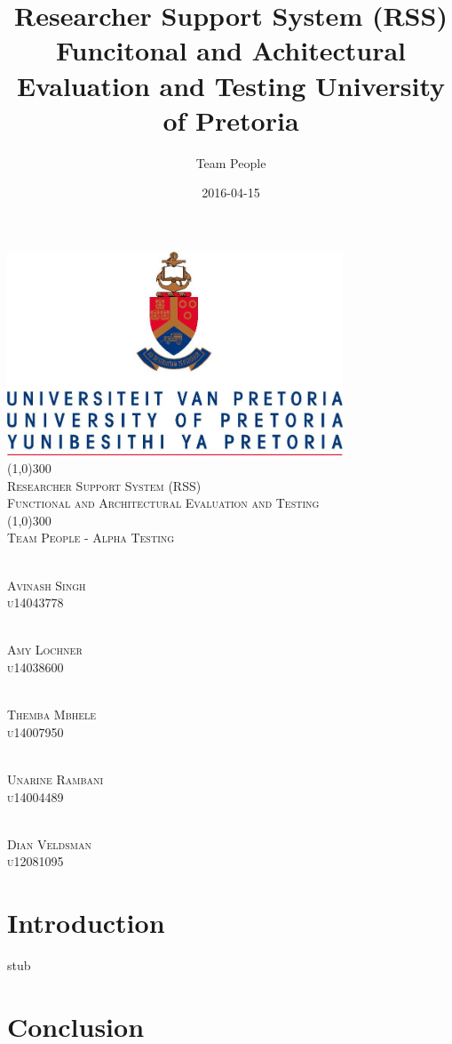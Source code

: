 \documentclass{article}
\title{
Researcher Support System (RSS)
Funcitonal and Achitectural Evaluation and Testing
University of Pretoria
}
\date{2016-04-15}
\author{Team People}
\begin{document}
\begin{titlepage}
	\begin{center}
		\includegraphics[width=10cm]{UP.jpg}  \\
		[1cm]
		\line(1,0){300} \\
		[0.3cm]
		\textsc{\Large
			Researcher Support System (RSS)\\
			Functional and Architectural Evaluation and Testing
		}\\
		[0.1cm]
		\line(1,0){300} \\
		[0.4cm]
		\textsc{\Large
			Team People - Alpha Testing
		} \\



	\end{center}
	\begin{center}

	\textsc{\large\\
	Avinash Singh\\ 
	u14043778\\ 
	}
	
	\textsc{\large\\
	Amy Lochner\\
	u14038600\\ 
	}
	
	\textsc{\large\\
	Themba Mbhele\\
	u14007950\\ 
	}

	\textsc{\large\\
	Unarine Rambani\\
	u14004489 \\
	}
	
	\textsc{\large\\
	Dian Veldsman\\
	u12081095\\
	}
	
	\end{center}
\end{titlepage}

\tableofcontents
\thispagestyle{empty}
\cleardoublepage

\setcounter{page}{1}
\section{Introduction}
stub 

\newpage

\section{Conclusion}
\end{document}

